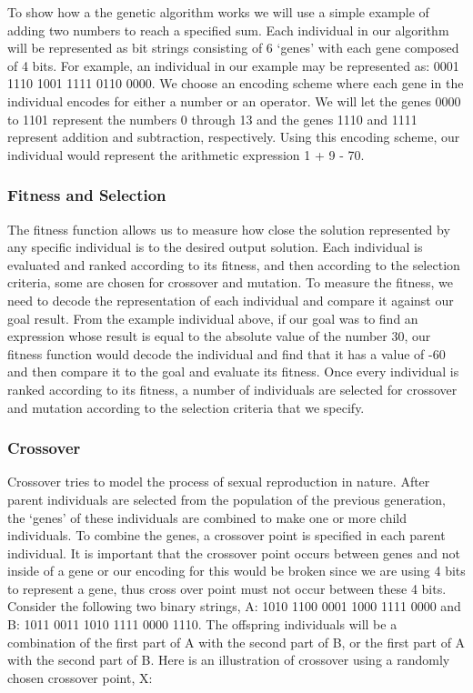 To show how a the genetic algorithm works we will use a simple example of adding two numbers to reach a specified sum. 
Each individual in our algorithm will be represented as bit strings consisting of 6 `genes' with each gene composed of 4
bits. For example, an individual in our example may be represented as:  0001 1110 1001 1111 0110 0000. We choose an
encoding scheme where each gene in the individual encodes for either a number or an operator. We will let the genes 0000 to 
1101 represent the numbers 0 through 13 and the genes 1110 and 1111 represent addition and subtraction, respectively. Using 
this encoding scheme, our individual would represent the arithmetic expression 1 + 9 - 70.

\subsubsection{Fitness and Selection}
The fitness function allows us to measure how close the solution represented by any specific individual is to the desired 
output solution. Each individual is evaluated and ranked according to its fitness, and then according to the selection 
criteria, some are chosen for crossover and mutation. To measure the fitness, we need to decode the representation of each 
individual and compare it against our goal result. From the example individual above, if our goal was to find an expression 
whose result is equal to the absolute value of the number 30, our fitness function would decode the individual and find that 
it has a value of -60 and then compare it to the goal and evaluate its fitness. Once every individual is ranked according 
to its fitness, a number of individuals are selected for crossover and mutation according to the selection criteria that we specify.


\subsubsection{Crossover}
Crossover tries to model the process of sexual reproduction in nature. After parent individuals are selected from the 
population of the previous generation, the `genes' of these individuals are combined to make one or more child individuals. To 
combine the genes, a crossover point is specified in each parent individual. It is important that the crossover point occurs between genes
and not inside of a gene or our encoding for this would be broken since we are using 4 bits to represent a gene, thus cross over point must not occur between these 4 bits. Consider the following two binary strings, A: 1010 1100 0001 1000 1111 0000 
and B: 1011 0011 1010 1111 0000 1110. The offspring individuals will be a combination of the first part of A with the second part of B, 
or the first part of A with the second part of B. Here is an illustration of crossover using a randomly chosen crossover point, X:


